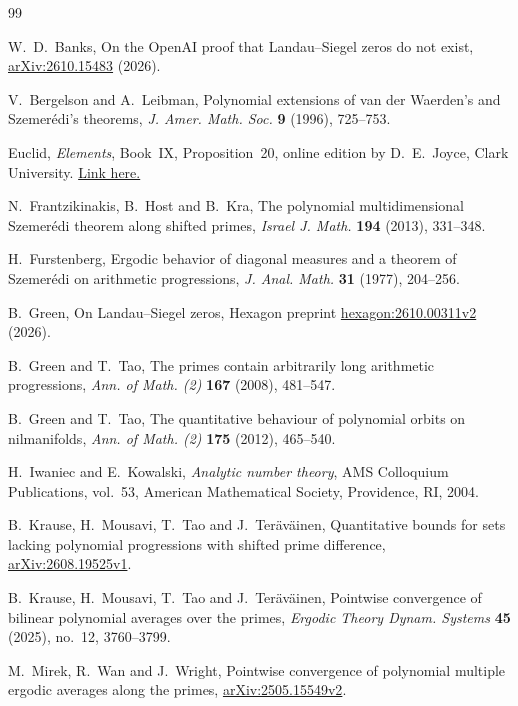 \documentclass[12pt]{amsart}
\newcommand{\1}{\mathbf 1}
\theoremstyle{definition}
\begin{document}
\begin{thebibliography}{99}

W.~D.~Banks, On the OpenAI proof that Landau--Siegel zeros do not exist,
\href{https://arxiv.org/abs/2610.15483}{arXiv:2610.15483} (2026).

V.~Bergelson and A.~Leibman, Polynomial extensions of van der Waerden's and
Szemer\'edi's theorems, \textit{J. Amer. Math. Soc.} \textbf{9} (1996), 725--753.

Euclid, \emph{Elements}, Book~IX, Proposition~20,
online edition by D.~E.~Joyce, Clark University.
\href{https://mathcs.clarku.edu/~djoyce/java/elements/bookIX/propIX20.html}{Link here.}

N.~Frantzikinakis, B.~Host and B.~Kra, The polynomial multidimensional
Szemer\'edi theorem along shifted primes, \textit{Israel J. Math.}
\textbf{194} (2013), 331--348.

H.~Furstenberg,
Ergodic behavior of diagonal measures and a theorem of Szemer\'edi
on arithmetic progressions,
\emph{J. Anal. Math.} \textbf{31} (1977), 204--256.

B.~Green, On Landau--Siegel zeros, Hexagon preprint
\href{https://hexagonmath.org/2610.00311v2}{hexagon:2610.00311v2} (2026).

B.~Green and T.~Tao, The primes contain arbitrarily long arithmetic
progressions, \textit{Ann. of Math. (2)} \textbf{167} (2008), 481--547.

B.~Green and T.~Tao, The quantitative behaviour of polynomial orbits
on nilmanifolds, \emph{Ann. of Math. (2)} \textbf{175} (2012), 465--540.

H.~Iwaniec and E.~Kowalski, \textit{Analytic number theory},
AMS Colloquium Publications, vol.~53, American Mathematical Society,
Providence, RI, 2004.

B.~Krause, H.~Mousavi, T.~Tao and J.~Ter\"av\"ainen,
Quantitative bounds for sets lacking polynomial progressions with shifted
prime difference, \href{https://arxiv.org/abs/2608.19525v1}{arXiv:2608.19525v1}.

B.~Krause, H.~Mousavi, T.~Tao and J.~Ter\"av\"ainen,
Pointwise convergence of bilinear polynomial averages over the primes,
\emph{Ergodic Theory Dynam. Systems} \textbf{45} (2025),
no.~12, 3760--3799.

M.~Mirek, R.~Wan and J.~Wright, Pointwise convergence of polynomial multiple
ergodic averages along the primes,
\href{https://arxiv.org/abs/2505.15549v2}{arXiv:2505.15549v2}.


\end{thebibliography}
\end{document}

